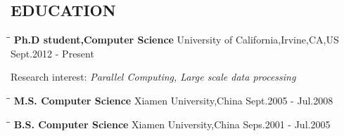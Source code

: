 \documentclass{res}
\begin{document}
\begin{resume}
\section{EDUCATION}          
   \vspace{-0.1in}	
   \begin{tabbing}
  \hspace{2.5in}\= \hspace{3in}\= \kill %
    {\bf Ph.D student,Computer Science} \>  University of California,Irvine,CA,US \>Sept.2012 - Present\\
   \end{tabbing}\vspace{-30pt}      %
   Research interest:\emph{ Parallel Computing, Large scale data processing }
   \vspace{-0.1in}	
   \begin{tabbing}
   \hspace{2.5in}\= \hspace{3in}\= \kill %
    {\bf M.S. Computer Science} \>Xiamen University,China     \>Sept.2005 - Jul.2008\\
   \end{tabbing}\vspace{-30pt}      %
   \vspace{-0.1in}	
   \begin{tabbing}
   \hspace{2.5in}\= \hspace{3in}\= \kill %
    {\bf B.S. Computer Science} \>Xiamen University,China     \>Seps.2001 - Jul.2005\\
   \end{tabbing}\vspace{-30pt}      %
 

\end{resume}
\end{document}
